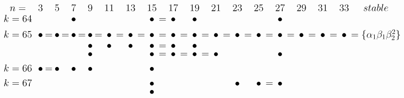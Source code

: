 \documentclass{article}
\begin{document}
\(
\begin{tikzcd}[
nodes={font=\Large,inner sep=0pt},
row sep=0.2cm,
column sep=0.1cm
]
n= && & 3 & & 5 & & 7 & & 9 & & 11 & & 13 & & 15 & & 17 && 19 && 21 && 23 && 25 && 27 && 29 && 31 && 33 & stable \\
k=64 &&& && && \bullet && && && && \bullet &=& \bullet && \bullet && && && && \bullet && \\ \\
k=65 &&& \bullet &=& \bullet &=& \bullet &=& \bullet &=& \bullet &=& \bullet &=& \bullet &=& \bullet &=& \bullet &=& \bullet &=& \bullet &=& \bullet &=& \bullet &=& \bullet &=& \bullet &=& \bullet & =\{\alpha_1\beta_1\beta_2^2\} \\
&&& && && && \bullet && \bullet && \bullet && \bullet &=& \bullet && \bullet && && && && \\
&&& && && && \bullet && && && \bullet &=& \bullet &=& \bullet &=& \bullet && && && \bullet \\ \\
k=66 &&& \bullet &=& \bullet && \bullet && \bullet && && && \bullet \\ \\
k=67 &&& && && && && && && \bullet && && && && \bullet && \bullet &=& \bullet \\
&&& && && && && && && \bullet \\
\\
\end{tikzcd}
\)
\end{document}
